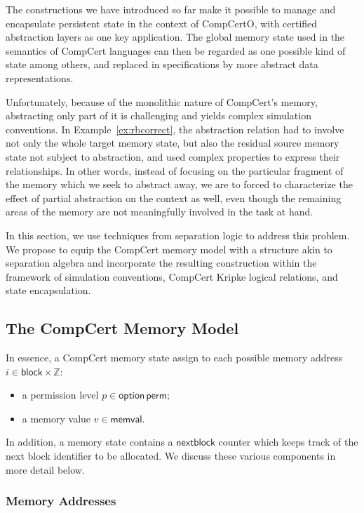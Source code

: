 \documentclass[acmsmall,screen,review,anonymous]{acmart}
\newcommand{\kw}[1]{\ensuremath{ \mathsf{#1} }}
\begin{document}
The constructions we have introduced so far
make it possible to manage and encapsulate persistent state
in the context of CompCertO,
with certified abstraction layers
as one key application.
The global memory state used in the semantics of CompCert languages
can then be regarded as one possible kind of state among others,
and replaced in specifications by more abstract data representations.

Unfortunately,
because of the monolithic nature of CompCert's memory,
abstracting only part of it is challenging
and yields complex simulation conventions.
In Example~\ref{ex:rbcorrect},
the abstraction relation had to involve
not only the whole target memory state,
but also the residual source memory state
not subject to abstraction,
and used complex properties to express their relationships.
In other words,
instead of focusing on the particular fragment of the memory
which we seek to abstract away,
we are to forced to characterize the effect of partial abstraction
on the context as well,
even though the remaining areas of the memory
are not meaningfully involved in the task at hand.

In this section,
we use techniques from separation logic
to address this problem.
We propose to equip the CompCert memory model
with a structure akin to separation algebra \cite{something-for-sa}
and incorporate the resulting construction
within the framework of simulation conventions,
CompCert Kripke logical relations,
and state encapsulation.

\subsection{The CompCert Memory Model}

In essence,
a CompCert memory state
assign to each possible memory address $i \in \kw{block} \times \mathbb{Z}$:
\begin{itemize}
  \item a permission level $p \in \kw{option}\,\kw{perm}$;
  \item a memory value $v \in \kw{memval}$.
\end{itemize}
In addition,
a memory state contains a $\kw{nextblock}$ counter
which keeps track of the next block identifier to be allocated.
We discuss these various components in more detail below.

\subsubsection{Memory Addresses}
\end{document}
